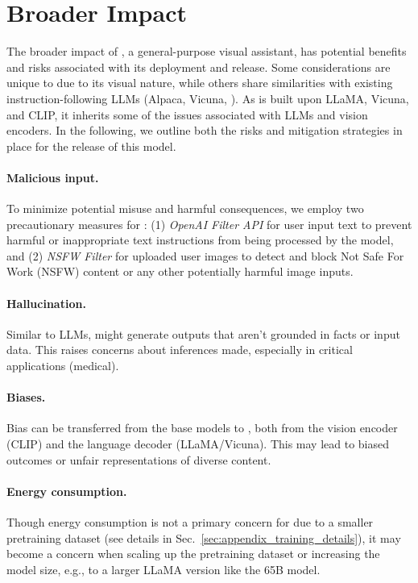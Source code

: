 

\section{Broader Impact}

The broader impact of \shortname{}, a general-purpose visual assistant, has potential benefits and risks associated with its deployment and release. Some considerations are unique to \shortname{} due to its visual nature, while others share similarities with existing instruction-following LLMs (\eg Alpaca, Vicuna, \etc). As \shortname{} is built upon LLaMA, Vicuna, and CLIP, it inherits some of the issues associated with LLMs and vision encoders. In the following, we outline both the risks and mitigation strategies in place for the release of this model.

\paragraph{Malicious input.}
To minimize potential misuse and harmful consequences, we employ two precautionary measures for \shortname{}: (1) \emph{OpenAI Filter API} for user input text to prevent harmful or inappropriate text instructions from being processed by the model, and (2) \emph{NSFW Filter} for uploaded user images to detect and block Not Safe For Work (NSFW) content or any other potentially harmful image inputs. 

\paragraph{Hallucination.}
Similar to LLMs, \shortname{} might generate outputs that aren't grounded in facts or input data. This raises concerns about inferences made, especially in critical applications (\eg medical).

\paragraph{Biases.}
Bias can be transferred from the base models to \shortname{}, both from the vision encoder (CLIP) and the language decoder (LLaMA/Vicuna). This may lead to biased outcomes or unfair representations of diverse content.

\paragraph{Energy consumption.}
Though energy consumption is not a primary concern for \shortname{} due to a smaller pretraining dataset (see details in Sec.~\ref{sec:appendix_training_details}), it may become a concern when scaling up the pretraining dataset or increasing the model size, e.g., to a larger LLaMA version like the 65B model.

